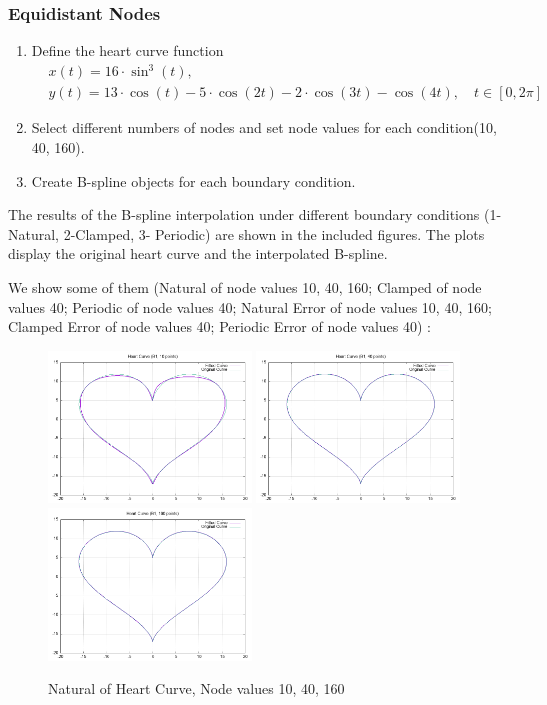 \documentclass{article}
\begin{document}
\subsubsection{Equidistant Nodes}
\begin{enumerate}
    \item Define the heart curve function
    \begin{align*}    
        &x(t) = 16 \cdot \sin^3(t), \\
        &y(t) = 13 \cdot \cos(t) - 5 \cdot \cos(2t) - 2 \cdot \cos(3t) - \cos(4t),\quad t\in [0, 2\pi]
    \end{align*}
    \item Select different numbers of nodes and set node values for each condition(10, 40, 160).
    \item Create B-spline objects for each boundary condition.
\end{enumerate}
The results of the B-spline interpolation under different boundary conditions (1-Natural, 2-Clamped, 3- Periodic) are shown in the included figures. The plots display the original heart curve and the interpolated B-spline.\par
We show some of them (Natural of node values 10, 40, 160; Clamped of node values 40; Periodic of node values 40; Natural Error of node values 10, 40, 160; Clamped Error of node values 40; Periodic Error of node values 40) :
\begin{figure}[H]
    \centering
    \includegraphics[width=0.48\textwidth]{../figure/B1heartspline_plot_10.png}
    \includegraphics[width=0.48\textwidth]{../figure/B1heartspline_plot_40.png}
    \includegraphics[width=0.48\textwidth]{../figure/B1heartspline_plot_160.png}
    \caption{Natural of Heart Curve, Node values 10, 40, 160}
\end{figure}
\end{document}
